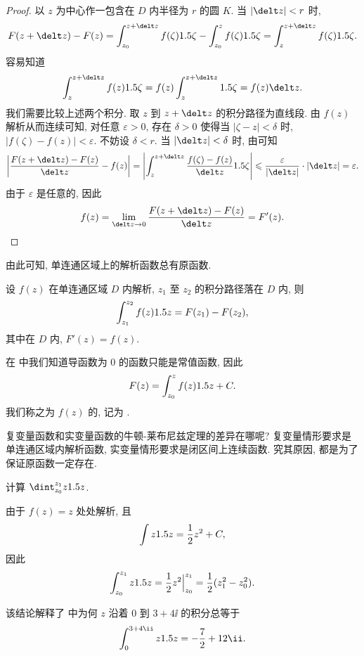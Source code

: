 \begin{proof}
  以 $z$ 为中心作一包含在 $D$ 内半径为 $r$ 的圆 $K$.
  当 $\abs{\delt z}<r$ 时,
  \[
     F(z+\delt z)-F(z)
    =\int_{z_0}^{z+\delt z}f(\zeta)\d\zeta-\int_{z_0}^zf(\zeta)\d\zeta
    =\int_z^{z+\delt z}f(\zeta)\d\zeta.
  \]
  容易知道
  \[
     \int_z^{z+\delt z}f(z)\d\zeta
    =f(z)\int_z^{z+\delt z}\d\zeta=f(z)\delt z.
  \]
  我们需要比较上述两个积分.
  取 $z$ 到 $z+\delt z$ 的积分路径为直线段.
  由 $f(z)$ 解析从而连续可知, 对任意 $\varepsilon>0$, 存在 $\delta>0$ 使得当 $|\zeta-z|<\delta$ 时, $|f(\zeta)-f(z)|<\varepsilon$.
  不妨设 $\delta<r$.
  当 $\abs{\delt z}<\delta$ 时, 由\thmGrowUp 可知
  \[
     \abs{\frac{F(z+\delt z)-F(z)}{\delt z}-f(z)}
    =\abs{\int_z^{z+\delt z}\frac{f(\zeta)-f(z)}{\delt z}\d \zeta}
    \le\frac{\varepsilon}{\abs{\delt z}}\cdot\abs{\delt z}
    =\varepsilon.
  \]
  由于 $\varepsilon$ 是任意的, 因此
  \[
    f(z)=\lim_{\delt z\ra 0}\frac{F(z+\delt z)-F(z)}{\delt z}=F'(z).\qedhere
  \]
\end{proof}

由此可知, \alert{单连通区域上的解析函数总有原函数}.

\begin{theorem}
  设 $f(z)$ 在单连通区域 $D$ 内解析, $z_1$ 至 $z_2$ 的积分路径落在 $D$ 内, 则
  \[
    \int_{z_1}^{z_2}f(z)1.5 z=F(z_1)-F(z_2),
  \]
  其中在 $D$ 内, $F'(z)=f(z)$.
\end{theorem}

在 中我们知道导函数为 $0$ 的函数只能是常值函数, 因此
\[
  F(z)=\int_{z_0}^zf(z)1.5 z+C.
\]
我们称之为 $f(z)$ 的, 记为 .

复变量函数和实变量函数的牛顿-莱布尼兹定理的差异在哪呢?
复变量情形要求是\alert{单连通区域内解析函数}, 实变量情形要求是\alert{闭区间上连续函数}.
究其原因, 都是为了保证原函数一定存在.

\begin{example}
  计算 $\dint_{z_0}^{z_1}z\d z$.
\end{example}

\begin{solution}
  由于 $f(z)=z$ 处处解析, 且
  \[
    \int z1.5 z=\frac{1}{2}  z^2+C,
  \]
  因此
  \[
     \int_{z_0}^{z_1}z1.5 z
    =\frac{1}{2} z^2\Big|_{z_0}^{z_1}
    =\frac{1}{2} (z_1^2-z_0^2).
  \]
\end{solution}

该结论解释了 中为何 $z$ 沿着 $0$ 到 $3+4\ii$ 的积分总等于
\[
  \int_0^{3+4\ii}z\d z=-\frac72+12\ii.
\]


